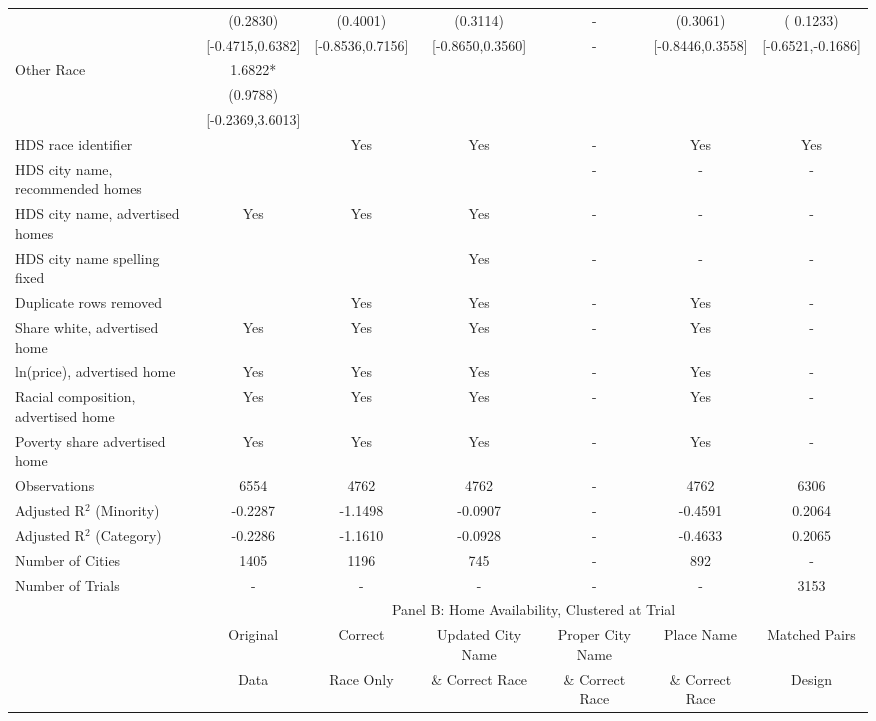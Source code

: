 \begin{table}[htbp]
{\begin{tabular}{l*{6}{c}}
 & (0.2830) & (0.4001) & (0.3114) & - & (0.3061) & ( 0.1233) \\
 & [-0.4715,0.6382] & [-0.8536,0.7156] & [-0.8650,0.3560] & - & [-0.8446,0.3558] & [-0.6521,-0.1686] \\
Other Race & 1.6822* &  &  &  &  &  \\
 & (0.9788) &  &  &  &  &  \\
 & [-0.2369,3.6013] &  &  &  &  &  \\
\midrule
HDS race identifier & & Yes & Yes & - & Yes & Yes \\
HDS city name, recommended homes &  &  & &- & - & -\\
HDS city name, advertised homes & Yes & Yes & Yes & - & - & -\\
HDS city name spelling fixed & & & Yes & - & - & -\\
Duplicate rows removed &  & Yes & Yes & - & Yes & - \\
\midrule
Share white, advertised home  & Yes & Yes & Yes & - & Yes & - \\
ln(price), advertised home  & Yes & Yes & Yes & - & Yes & - \\
Racial composition, advertised home & Yes & Yes & Yes & - & Yes & - \\
Poverty share advertised home & Yes & Yes & Yes & - & Yes & - \\
Observations & 6554 & 4762 & 4762 & - & 4762 & 6306 \\
Adjusted R$^2$ (Minority) & -0.2287 & -1.1498 & -0.0907 & - & -0.4591 & 0.2064 \\
Adjusted R$^2$ (Category) & -0.2286 & -1.1610 & -0.0928 & - & -0.4633 & 0.2065 \\
Number of Cities & 1405 & 1196 & 745 & - & 892 & - \\
Number of Trials & - & - & - & - & - & 3153 \\
\bottomrule
\toprule
& \multicolumn{6}{c}{Panel B: Home Availability, Clustered at Trial}\\
\toprule
                    &\multicolumn{1}{c}{Original}&\multicolumn{1}{c}{Correct}&\multicolumn{1}{c}{Updated City Name}&\multicolumn{1}{c}{Proper City Name}&\multicolumn{1}{c}{Place Name}&\multicolumn{1}{c}{Matched Pairs}\\
                      &\multicolumn{1}{c}{Data}&\multicolumn{1}{c}{Race Only}&\multicolumn{1}{c}{\& Correct Race}&\multicolumn{1}{c}{\& Correct Race}&\multicolumn{1}{c}{\& Correct Race}&\multicolumn{1}{c}{Design}\\                  
                    \cmidrule(lr){2-2}\cmidrule(lr){3-3}\cmidrule(lr){4-4}\cmidrule(lr){5-5}\cmidrule(lr){6-6}\cmidrule(lr){7-7}

\end{tabular}}
\end{table}
